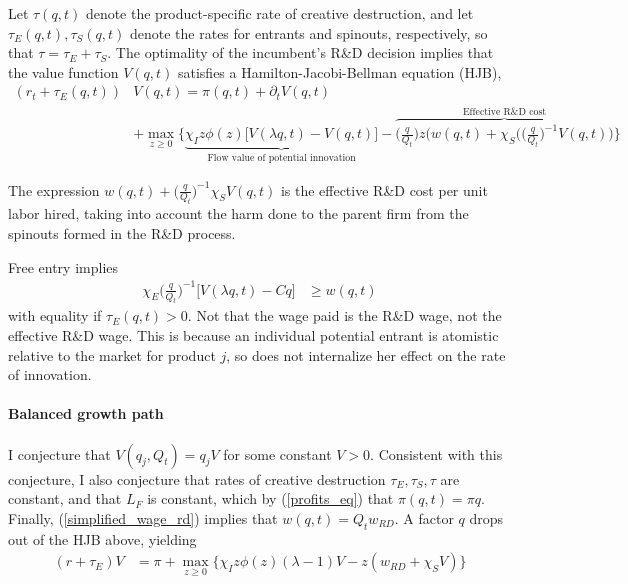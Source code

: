 \documentclass[12pt,english]{article}
\theoremstyle{remark}
\begin{document}
Let $\tau(q,t)$ denote the product-specific rate of creative destruction, and let $\tau_E(q,t),\tau_S(q,t)$ denote the rates for entrants and spinouts, respectively, so that $\tau = \tau_E + \tau_S$. The optimality of the incumbent's R\&D decision implies that the value function $V(q,t)$ satisfies a Hamilton-Jacobi-Bellman equation (HJB),
\begin{align}
	(r_t + \tau_E(q,t)) &V(q,t) = \pi(q,t) + \partial_tV(q,t) \nonumber \\ 
	                         &+ \max_{z \ge 0} \Bigg\{ \underbrace{\chi_I z\phi(z) \Big[V(\lambda q,t) - V(q,t) \Big]}_{\textrm{Flow value of potential innovation}} - \overbrace{\Big(\frac{q}{Q_t}\Big) z \Big( w(q,t) + \chi_S \Big( \Big(\frac{q}{Q_t}\Big)^{-1} V(q,t) \Big)}^{\textrm{Effective R\&D cost}} \Bigg\}
\end{align}

The expression $w(q,t) +\Big(\frac{q}{Q_t}\Big)^{-1} \chi_S V(q,t)$ is the effective R\&D cost per unit labor hired, taking into account the harm done to the parent firm from the spinouts formed in the R\&D process.

Free entry implies
\begin{align}
	\chi_E \Big(\frac{q}{Q_t}\Big)^{-1} \Big[ V(\lambda q,t) - Cq \Big]  &\ge w(q,t)  \nonumber
\end{align}
with equality if $\tau_E(q,t) > 0$. Not that the wage paid is the R\&D wage, not the effective R\&D wage. This is because an individual potential entrant is atomistic relative to the market for product $j$, so does not internalize her effect on the rate of innovation.

\paragraph{Balanced growth path}

I conjecture that $V(q_j,Q_t) = q_j V$ for some constant $V > 0$. Consistent with this conjecture, I also conjecture that rates of creative destruction $\tau_E,\tau_S,\tau$ are constant, and that $L_F$ is constant, which by (\ref{profits_eq}) that $\pi(q,t) = \pi q$. Finally, (\ref{simplified_wage_rd}) implies that $w(q,t) = Q_t w_{RD}$. A factor $q$ drops out of the HJB above, yielding
\begin{align}
	(r + \tau_E) V &= \pi + \max_{z \ge 0} \Big\{  \chi_I z \phi(z) (\lambda -1) V - z (w_{RD} + \chi_S V ) \Big\} \label{simplified_BGP_HJB_I}
\end{align} 
\end{document}
